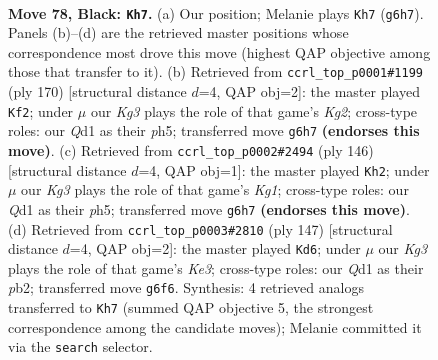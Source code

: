 \documentclass[11pt]{article}
\begin{document}
\clearpage

\begin{figure}[p]\centering
\begin{subfigure}{0.46\textwidth}\centering
\resizebox{\linewidth}{!}{%
\newchessgame
\chessboard[
  setfen={8/8/1p4k1/p7/2P5/8/1K6/3q4 b - - 13 78},
  showmover=false,
  pgfstyle=straightmove, color=movearrow, markmove={g6-h7}
]}
\caption{}
\end{subfigure}\hfill
\begin{subfigure}{0.46\textwidth}\centering
\resizebox{\linewidth}{!}{%
\newchessgame
\chessboard[
  setfen={8/6k1/8/p6p/2P5/1P6/6K1/8 w - - 19 86},
  showmover=false,
  pgfstyle=straightmove, color=movearrow, markmove={g2-f2}
]}
\caption{}
\end{subfigure}
\\[4pt]
\begin{subfigure}{0.46\textwidth}\centering
\resizebox{\linewidth}{!}{%
\newchessgame
\chessboard[
  setfen={8/8/8/3k2Pp/5p1P/8/8/6K1 w - - 12 74},
  showmover=false,
  pgfstyle=straightmove, color=movearrow, markmove={g1-h2}
]}
\caption{}
\end{subfigure}\hfill
\begin{subfigure}{0.46\textwidth}\centering
\resizebox{\linewidth}{!}{%
\newchessgame
\chessboard[
  setfen={8/6p1/4k1Pp/8/4K3/8/1P6/8 b - - 0 74},
  showmover=false,
  pgfstyle=straightmove, color=movearrow, markmove={e6-d6}
]}
\caption{}
\end{subfigure}
\caption{\textbf{Move 78, Black: \texttt{Kh7}.} (a) Our position; Melanie plays \texttt{Kh7} (\texttt{g6h7}). Panels (b)--(d) are the retrieved master positions whose correspondence most drove this move (highest QAP objective among those that transfer to it). (b) Retrieved from \texttt{ccrl\_top\_p0001\#1199} (ply 170) [structural distance $d$=4, QAP obj=2]: the master played \texttt{Kf2}; under $\mu$ our \emph{Kg3} plays the role of that game's \emph{Kg2}; cross-type roles: our \emph{Q}d1 as their \emph{p}h5; transferred move \texttt{g6h7} \textbf{(endorses this move)}. (c) Retrieved from \texttt{ccrl\_top\_p0002\#2494} (ply 146) [structural distance $d$=4, QAP obj=1]: the master played \texttt{Kh2}; under $\mu$ our \emph{Kg3} plays the role of that game's \emph{Kg1}; cross-type roles: our \emph{Q}d1 as their \emph{p}h5; transferred move \texttt{g6h7} \textbf{(endorses this move)}. (d) Retrieved from \texttt{ccrl\_top\_p0003\#2810} (ply 147) [structural distance $d$=4, QAP obj=2]: the master played \texttt{Kd6}; under $\mu$ our \emph{Kg3} plays the role of that game's \emph{Ke3}; cross-type roles: our \emph{Q}d1 as their \emph{p}b2; transferred move \texttt{g6f6}. Synthesis: 4 retrieved analogs transferred to \texttt{Kh7} (summed QAP objective 5, the strongest correspondence among the candidate moves); Melanie committed it via the \texttt{search} selector.}
\label{fig:thought-m155}
\end{figure}
\end{document}
